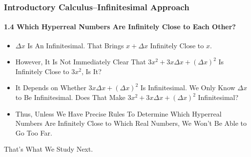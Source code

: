 \begin{frame}
\frametitle{Introductory Calculus--Infinitesimal Approach}
\framesubtitle{1.4 Which Hyperreal Numbers Are Infinitely Close to Each Other?}
\label{slide:1.4-12}
\begin{itemize}
\item
\alert{$\Delta x$ Is An Infinitesimal. That Brings $x+\Delta x$ Infinitely Close to $x$.}

\pause \item However, It Is Not Immediately Clear That $3x^2+3x\Delta x+(\Delta x)^2$ Is Infinitely Close to $3x^2$, Is It?
\pause \item It Depends on Whether $3x\Delta x+(\Delta x)^2$ Is Infinitesimal. We Only Know $\Delta x$ to Be Infinitesimal. Does That Make $3x^2+3x\Delta x+(\Delta x)^2$ Infinitesimal?

\pause\item Thus, Unless We Have Precise Rules To Determine Which Hyperreal Numbers Are \alert{Infinitely Close} to Which Real Numbers, We Won't Be Able to Go Too Far.
\end{itemize}
\pause
\alert{That's What We Study Next}.
\end{frame}
